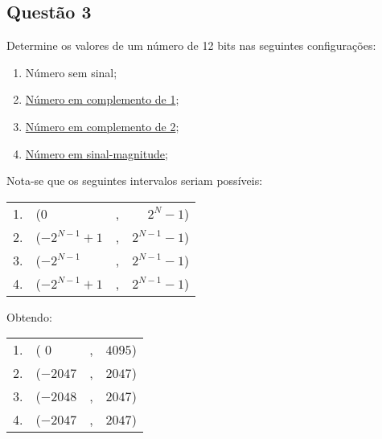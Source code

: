 \documentclass{article}
\begin{document}
        \subsection{Questão 3}
            \begin{exercise}
                Determine os valores de um número de 12 bits nas seguintes configurações:
                    \begin{enumerate}[noitemsep]
                        \item Número sem sinal;
                        \item \href{https://en.wikipedia.org/wiki/Ones%27_complement}{Número em complemento de 1};
                        \item \href{https://en.wikipedia.org/wiki/Two%27s_complement}{Número em complemento de 2};
                        \item \href{https://en.wikipedia.org/wiki/Signed_number_representations}{Número em sinal-magnitude};
                    \end{enumerate}
            \end{exercise}
            \begin{resolution}
                Nota-se que os seguintes intervalos seriam possíveis:
                    \begin{table}[H]
                        \centering
                        \begin{tabular}[]{clcr}\hline
                            1. & ($0$          & , & $2^{N}-1$)\\
                            2. & ($-2^{N-1}+1$ & , & $2^{N-1}-1$)\\
                            3. & ($-2^{N-1}$   & , & $2^{N-1}-1$)\\
                            4. & ($-2^{N-1}+1$ & , & $2^{N-1}-1$)\\\hline
                        \end{tabular}
                    \end{table}
                Obtendo:
                    \begin{table}[H]
                        \centering
                        \begin{tabular}[]{clcr}\hline
                            1. & (    $0$ & , & $4095$)\\
                            2. & ($-2047$ & , & $2047$)\\
                            3. & ($-2048$ & , & $2047$)\\
                            4. & ($-2047$ & , & $2047$)\\\hline
                        \end{tabular}
                    \end{table}
            \end{resolution}
\newpage
\end{document}
